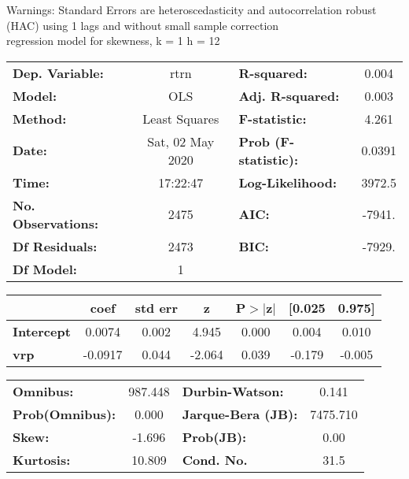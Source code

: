 Warnings: \newline
 [1] Standard Errors are heteroscedasticity and autocorrelation robust (HAC) using 1 lags and without small sample correction\\ 

regression model for skewness, k = 1 h = 12\begin{center}
\begin{tabular}{lclc}
\toprule
\textbf{Dep. Variable:}    &       rtrn       & \textbf{  R-squared:         } &     0.004   \\
\textbf{Model:}            &       OLS        & \textbf{  Adj. R-squared:    } &     0.003   \\
\textbf{Method:}           &  Least Squares   & \textbf{  F-statistic:       } &     4.261   \\
\textbf{Date:}             & Sat, 02 May 2020 & \textbf{  Prob (F-statistic):} &   0.0391    \\
\textbf{Time:}             &     17:22:47     & \textbf{  Log-Likelihood:    } &    3972.5   \\
\textbf{No. Observations:} &        2475      & \textbf{  AIC:               } &    -7941.   \\
\textbf{Df Residuals:}     &        2473      & \textbf{  BIC:               } &    -7929.   \\
\textbf{Df Model:}         &           1      & \textbf{                     } &             \\
\bottomrule
\end{tabular}
\begin{tabular}{lcccccc}
                   & \textbf{coef} & \textbf{std err} & \textbf{z} & \textbf{P$> |$z$|$} & \textbf{[0.025} & \textbf{0.975]}  \\
\midrule
\textbf{Intercept} &       0.0074  &        0.002     &     4.945  &         0.000        &        0.004    &        0.010     \\
\textbf{vrp}       &      -0.0917  &        0.044     &    -2.064  &         0.039        &       -0.179    &       -0.005     \\
\bottomrule
\end{tabular}
\begin{tabular}{lclc}
\textbf{Omnibus:}       & 987.448 & \textbf{  Durbin-Watson:     } &    0.141  \\
\textbf{Prob(Omnibus):} &   0.000 & \textbf{  Jarque-Bera (JB):  } & 7475.710  \\
\textbf{Skew:}          &  -1.696 & \textbf{  Prob(JB):          } &     0.00  \\
\textbf{Kurtosis:}      &  10.809 & \textbf{  Cond. No.          } &     31.5  \\
\bottomrule
\end{tabular}
\end{center}

